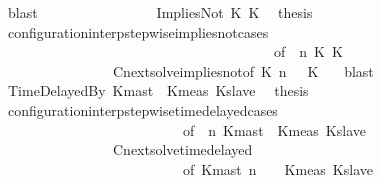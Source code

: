\begin{isabellebody}
\ blast\isanewline
\ \ \ \ \ \ \isamarkupfalse%
\isanewline
\ \ \ \ \ \ \ \ \isamarkupfalse%
\ {\isacharparenleft}ImpliesNot\ K{}\ K{}{\isacharparenright}\ \isamarkupfalse%
\ {\isacharquery}thesis\isanewline
\ \ \ \ \ \ \ \ \ \ \isamarkupfalse%
\ configuration{\isacharunderscore}interp{\isacharunderscore}stepwise{\isacharunderscore}implies{\isacharunderscore}not{\isacharunderscore}cases\isanewline
\ \ \ \ \ \ \ \ \ \ \ \ \ \ \ \ \ \ \ \ \ \ \ \ \ \ \ \ \ \ \ \ \ \ \ \ \ \ \ {\isacharbrackleft}of\ {\isacartoucheopen}{\isasymGamma}{\isacartoucheclose}\ {\isacartoucheopen}n{\isacartoucheclose}\ {\isacartoucheopen}K{}{\isacartoucheclose}\ {\isacartoucheopen}K{}{\isacartoucheclose}\ {\isacartoucheopen}{\isasymPsi}{\isacartoucheclose}\ {\isacartoucheopen}{\isasymPhi}{\isacartoucheclose}{\isacharbrackright}\isanewline
\ \ \ \ \ \ \ \ \ \ \ \ \ \ \ \ Cnext{\isacharunderscore}solve{\isacharunderscore}implies{\isacharunderscore}not{\isacharbrackleft}of\ {\isacartoucheopen}K{}{\isacartoucheclose}\ {\isacartoucheopen}n{\isacartoucheclose}\ {\isacartoucheopen}{\isasymGamma}{\isacartoucheclose}\ {\isacartoucheopen}{\isasymPsi}{\isacartoucheclose}\ {\isacartoucheopen}K{}{\isacartoucheclose}\ {\isacartoucheopen}{\isasymPhi}{\isacartoucheclose}{\isacharbrackright}\ \isamarkupfalse%
\ blast\isanewline
\ \ \ \ \ \ \isamarkupfalse%
\isanewline
\ \ \ \ \ \ \ \ \isamarkupfalse%
\ {\isacharparenleft}TimeDelayedBy\ Kmast\ {\isasymtau}\ Kmeas\ Kslave{\isacharparenright}\ \isamarkupfalse%
\ {\isacharquery}thesis\isanewline
\ \ \ \ \ \ \ \ \ \ \isamarkupfalse%
\ configuration{\isacharunderscore}interp{\isacharunderscore}stepwise{\isacharunderscore}timedelayed{\isacharunderscore}cases\isanewline
\ \ \ \ \ \ \ \ \ \ \ \ \ \ \ \ \ \ \ \ \ \ \ \ \ \ {\isacharbrackleft}of\ {\isacartoucheopen}{\isasymGamma}{\isacartoucheclose}\ {\isacartoucheopen}n{\isacartoucheclose}\ {\isacartoucheopen}Kmast{\isacartoucheclose}\ {\isacartoucheopen}{\isasymtau}{\isacartoucheclose}\ {\isacartoucheopen}Kmeas{\isacartoucheclose}\ {\isacartoucheopen}Kslave{\isacartoucheclose}\ {\isacartoucheopen}{\isasymPsi}{\isacartoucheclose}\ {\isacartoucheopen}{\isasymPhi}{\isacartoucheclose}{\isacharbrackright}\isanewline
\ \ \ \ \ \ \ \ \ \ \ \ \ \ \ \ Cnext{\isacharunderscore}solve{\isacharunderscore}timedelayed\isanewline
\ \ \ \ \ \ \ \ \ \ \ \ \ \ \ \ \ \ \ \ \ \ \ \ \ \ {\isacharbrackleft}of\ {\isacartoucheopen}Kmast{\isacartoucheclose}\ {\isacartoucheopen}n{\isacartoucheclose}\ {\isacartoucheopen}{\isasymGamma}{\isacartoucheclose}\ {\isacartoucheopen}{\isasymPsi}{\isacartoucheclose}\ {\isacartoucheopen}{\isasymtau}{\isacartoucheclose}\ {\isacartoucheopen}Kmeas{\isacartoucheclose}\ {\isacartoucheopen}Kslave{\isacartoucheclose}\ {\isacartoucheopen}{\isasymPhi}{\isacartoucheclose}{\isacharbrackright}\ \isamarkupfalse%

\end{isabellebody}
